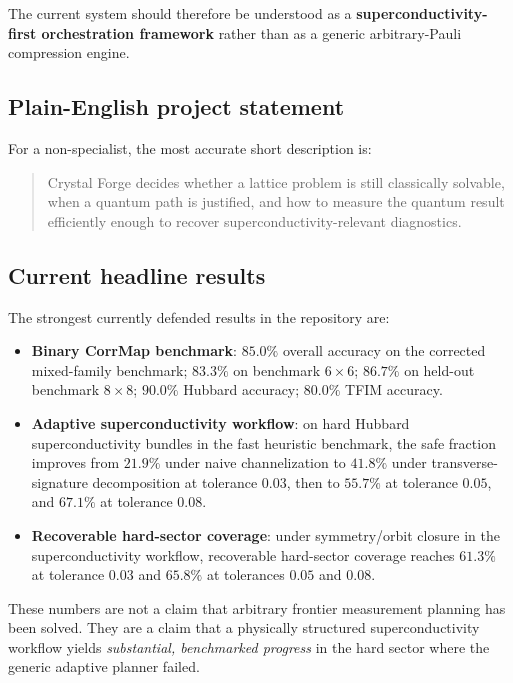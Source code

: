 \documentclass[11pt]{article}
\begin{document}
The current system should therefore be understood as a \textbf{superconductivity-first orchestration framework} rather than as a generic arbitrary-Pauli compression engine.

\subsection{Plain-English project statement}

For a non-specialist, the most accurate short description is:

\begin{quote}
Crystal Forge decides whether a lattice problem is still classically solvable, when a quantum path is justified, and how to measure the quantum result efficiently enough to recover superconductivity-relevant diagnostics.
\end{quote}

\subsection{Current headline results}

The strongest currently defended results in the repository are:

\begin{itemize}
\item \textbf{Binary CorrMap benchmark}: \(85.0\%\) overall accuracy on the corrected mixed-family benchmark; \(83.3\%\) on benchmark \(6\times 6\); \(86.7\%\) on held-out benchmark \(8\times 8\); \(90.0\%\) Hubbard accuracy; \(80.0\%\) TFIM accuracy.
\item \textbf{Adaptive superconductivity workflow}: on hard Hubbard superconductivity bundles in the fast heuristic benchmark, the safe fraction improves from \(21.9\%\) under naive channelization to \(41.8\%\) under transverse-signature decomposition at tolerance \(0.03\), then to \(55.7\%\) at tolerance \(0.05\), and \(67.1\%\) at tolerance \(0.08\).
\item \textbf{Recoverable hard-sector coverage}: under symmetry/orbit closure in the superconductivity workflow, recoverable hard-sector coverage reaches \(61.3\%\) at tolerance \(0.03\) and \(65.8\%\) at tolerances \(0.05\) and \(0.08\).
\end{itemize}

These numbers are not a claim that arbitrary frontier measurement planning has been solved. They are a claim that a physically structured superconductivity workflow yields \emph{substantial, benchmarked progress} in the hard sector where the generic adaptive planner failed.
\end{document}
